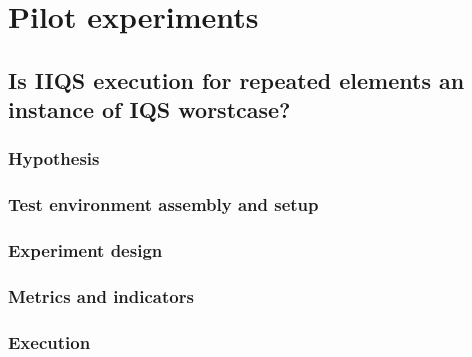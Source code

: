 \documentclass{iccmemoria}
\begin{document}

\section{Pilot experiments}

\subsection{Is IIQS execution for repeated elements an instance of IQS worstcase?}
\subsubsection{Hypothesis}
\subsubsection{Test environment assembly and setup}
\subsubsection{Experiment design}
\subsubsection{Metrics and indicators}
\subsubsection{Execution}
\end{document}
